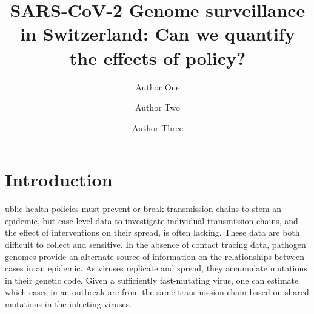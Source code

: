 \documentclass[9pt,twocolumn,twoside,lineno]{pnas-new}
\title{SARS-CoV-2 Genome surveillance in Switzerland: Can we quantify the effects of policy?}
\author[a,c,1]{Author One}
\author[b,1,2]{Author Two}
\author[a]{Author Three}
\affil[a]{Affiliation One}
\affil[b]{Affiliation Two}
\affil[c]{Affiliation Three}
\begin{document}
\maketitle
\thispagestyle{firststyle}



\section{Introduction}

ublic health policies must prevent or break transmission chains to stem an epidemic, but case-level data to investigate individual transmission chains, and the effect of interventions on their spread, is often lacking. These data are both difficult to collect and sensitive. In the absence of contact tracing data, pathogen genomes provide an alternate source of information on the relationships between cases in an epidemic. As viruses replicate and spread, they accumulate mutations in their genetic code. Given a sufficiently fast-mutating virus, one can estimate which cases in an outbreak are from the same transmission chain based on shared mutations in the infecting viruses. 
\end{document}
